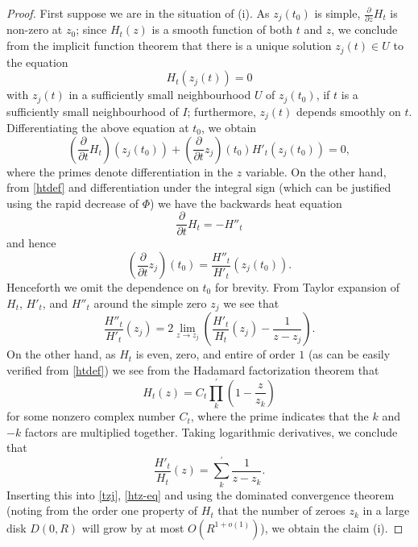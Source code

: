 \begin{proof}  First suppose we are in the situation of (i).  As $z_j(t_0)$ is simple, $\frac{\partial}{\partial z} H_t$ is non-zero at $z_0$; since $H_t(z)$ is a smooth function of both $t$ and $z$, we conclude from the implicit function theorem that there is a unique solution $z_j(t) \in U$ to the equation
$$ H_t( z_j(t) ) = 0$$
with $z_j(t)$ in a sufficiently small neighbourhood $U$ of $z_j(t_0)$, if $t$ is a sufficiently small neighbourhood of $I$; furthermore, $z_j(t)$ depends smoothly on $t$.  Differentiating the above equation at $t_0$, we obtain
$$ (\frac{\partial}{\partial t} H_t)( z_j(t_0) ) + (\frac{\partial}{\partial t} z_j)(t_0) H'_t(z_j(t_0)) = 0,$$
where the primes denote differentiation in the $z$ variable.
On the other hand, from \eqref{htdef} and differentiation under the integral sign (which can be justified using the rapid decrease of $\Phi$) we have the backwards heat equation
\begin{equation}\label{back}
\frac{\partial}{\partial t} H_t = -H''_t
\end{equation}
and hence
\begin{equation}\label{tzj}
(\frac{\partial}{\partial t} z_j)(t_0)  = \frac{H''_t}{H'_t}( z_j(t_0) ).
\end{equation}
Henceforth we omit the dependence on $t_0$ for brevity.  From Taylor expansion of $H_t$, $H'_t$, and $H''_t$ around the simple zero $z_j$ we see that
\begin{equation}\label{htz-eq}
 \frac{H''_t}{H'_t}( z_j) = 2 \lim_{z \to z_j}\left(  \frac{H'_t}{H_t}( z_j) - \frac{1}{z-z_j} \right).
\end{equation}
On the other hand, as $H_t$ is even, zero, and entire of order $1$ (as can be easily verified from \eqref{htdef}) we see from the Hadamard factorization theorem that
$$ H_t(z) = C_t \prod_k^{\prime} (1 - \frac{z}{z_k})$$
for some nonzero complex number $C_t$, where the prime indicates that the $k$ and $-k$ factors are multiplied together.  Taking logarithmic derivatives, we conclude that
$$ \frac{H'_t}{H_t}(z) = \sum_k^{\prime} \frac{1}{z-z_k}.$$
Inserting this into \eqref{tzj}, \eqref{htz-eq} and using the dominated convergence theorem (noting from the order one property of $H_t$ that the number of zeroes $z_k$ in a large disk $D(0,R)$ will grow by at most $O(R^{1+o(1)})$), we obtain the claim (i).


\end{proof}
